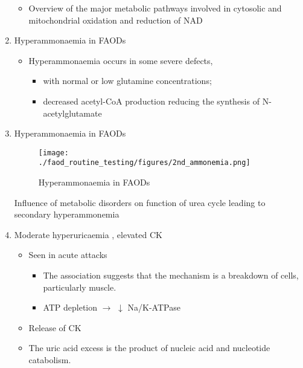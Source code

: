 \documentclass{scrartcl}
\begin{document}
\begin{enumerate}
\begin{itemize}
\item Overview of the major metabolic pathways involved in cytosolic and
mitochondrial oxidation and reduction of NAD
\end{itemize}

\item Hyperammonaemia in FAODs
\label{sec:orgabe676b}
\begin{itemize}
\item Hyperammonaemia occurs in some severe defects,
\begin{itemize}
\item with normal or low glutamine concentrations;
\item decreased acetyl-CoA production reducing the synthesis of N-acetylglutamate
\end{itemize}
\end{itemize}

\item Hyperammonaemia in FAODs
\label{sec:orgdb74d05}
\begin{figure}[htbp]
\centering
\texttt{[image: ./faod\_routine\_testing/figures/2nd\_ammonemia.png]}
\caption{\label{fig:orgdf40999}
Hyperammonaemia in FAODs}
\end{figure}

Influence of metabolic disorders on function of urea cycle leading to secondary hyperammonemia

\item Moderate hyperuricaemia , elevated CK
\label{sec:orgb7cb82f}
\begin{itemize}
\item Seen in acute attacks 
\begin{itemize}
\item The association suggests that the mechanism is a breakdown of
cells, particularly muscle.
\item ATP depletion \(\to\) \(\downarrow\) Na/K-ATPase
\end{itemize}
\item Release of CK
\item The uric acid excess is the product of nucleic acid and nucleotide catabolism.
\end{itemize}


\end{enumerate}
\end{document}

